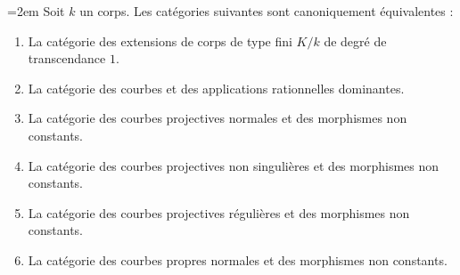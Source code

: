 \begin{theorem}
\label{theorem-curves-rational-maps}
{\emergencystretch=2em
Soit $k$ un corps. Les catégories suivantes sont canoniquement équivalentes : \begin{enumerate} \item La catégorie des extensions de corps de type fini $K/k$ de degré de transcendance $1$. \item La catégorie des courbes et des applications rationnelles dominantes. \item La catégorie des courbes projectives normales et des morphismes non constants. \item La catégorie des courbes projectives non singulières et des morphismes non constants. \item La catégorie des courbes projectives régulières et des morphismes non constants. \item La catégorie des courbes propres normales et des morphismes non constants.
\end{enumerate}
\par}
\end{theorem}

